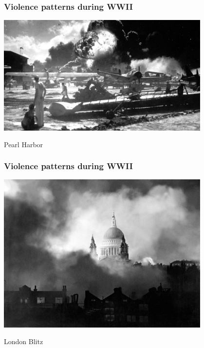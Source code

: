 \documentclass[aspectratio=43]{beamer}
\begin{document}
\begin{frame}
\frametitle{Violence patterns during WWII}
\centering

\includegraphics[width = 0.8\textwidth]{img/wwii-pearlharbor}

Pearl Harbor

\end{frame}

\begin{frame}
\frametitle{Violence patterns during WWII}
\centering

\includegraphics[width = 0.8\textwidth]{img/wwii-londonblitz}

London Blitz

\end{frame}
\end{document}
